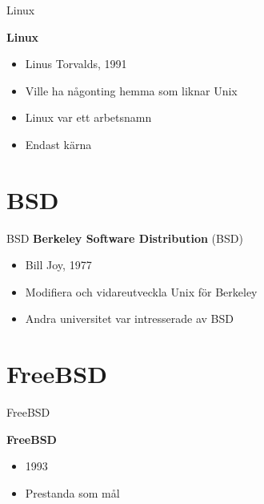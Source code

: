 \documentclass[compress, final]{beamer}
\begin{document}
\begin{frame}{Linux}
  \begin{minipage}[l]{0.60\textwidth}
    \textbf{Linux}
    \begin{itemize}
      \item Linus Torvalds, 1991
      \item Ville ha någonting hemma som liknar Unix
      \item Linux var ett arbetsnamn
      \item Endast kärna
    \end{itemize}
  \end{minipage}
  \begin{minipage}[r]{0.35\textwidth}
  \end{minipage}
\end{frame}


\section{BSD}

\begin{frame}{BSD}
  \textbf{Berkeley Software Distribution} (BSD)
  \begin{itemize}
    \item Bill Joy, 1977
    \item Modifiera och vidareutveckla Unix för Berkeley
    \item Andra universitet var intresserade av BSD
  \end{itemize}
\end{frame}


\section{FreeBSD}

\begin{frame}{FreeBSD}
  \begin{minipage}[l]{0.60\textwidth}
    \textbf{FreeBSD}
    \begin{itemize}
      \item 1993
      \item Prestanda som mål
    \end{itemize}
  \end{minipage}
  \begin{minipage}[r]{0.35\textwidth}
  \end{minipage}
\end{frame}
\end{document}
